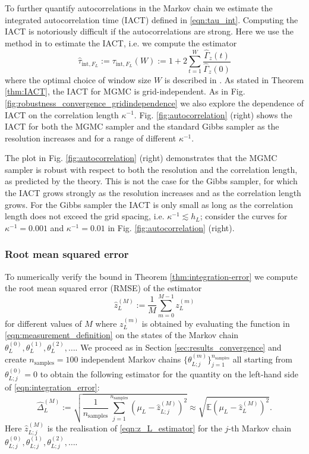\documentclass[11pt,english]{article}
\theoremstyle{plain}
\theoremstyle{plain}
\theoremstyle{plain}
\theoremstyle{plain}
\numberwithin{equation}{section}
\begin{document}
To further quantify autocorrelations in the Markov chain we estimate the integrated autocorrelation time (IACT) defined in \eqref{eqn:tau_int}. Computing the IACT is notoriously difficult if the autocorrelations are strong. Here we use the method in \cite{wolff2004monte} to estimate the IACT, i.e. we compute the estimator
\begin{equation}
    \widehat{\tau}_{\text{int},F_L} := \tau_{\text{int},F_L}(W) := 1+2\sum_{t=1}^{W} \frac{\widehat{\Gamma}_z(t)}{\widehat{\Gamma}_z(0)}
\end{equation}
where the optimal choice of window size $W$ is described in \cite[Section 3.3]{wolff2004monte}.
As stated in Theorem \ref{thm:IACT}, the IACT for MGMC is grid-independent. As in Fig. \ref{fig:robustness_convergence_gridindependence} we also explore the dependence of IACT on the correlation length $\kappa^{-1}$. Fig. \ref{fig:autocorrelation} (right) shows the IACT for both the MGMC sampler and the standard Gibbs sampler as the resolution increases and for a range of different $\kappa^{-1}$.

The plot in Fig. \ref{fig:autocorrelation} (right) demonstrates that the MGMC sampler is robust with respect to both the resolution and the correlation length, as predicted by the theory. This is not the case for the Gibbs sampler, for which the IACT grows strongly as the resolution increases and as the correlation length grows. For the Gibbs sampler the IACT is only small as long as the correlation length does not exceed the grid spacing, i.e. $\kappa^{-1}\lesssim h_L$; consider the curves for $\kappa^{-1}=0.001$ and $\kappa^{-1}=0.01$ in Fig. \ref{fig:autocorrelation} (right).
\subsubsection{Root mean squared error}
To numerically verify the bound in Theorem \ref{thm:integration-error} we compute the root mean squared error (RMSE) of the estimator
\begin{equation}
    \widehat{z}_{L}^{(M)} := \frac{1}{M}\sum_{m=0}^{M-1} z_{L}^{(m)}         \label{eqn:z_L_estimator}
\end{equation}
for different values of $M$ where $z_L^{(m)}$ is obtained by evaluating the function in \eqref{eqn:measurement_definition} on the states of the Markov chain $\theta_L^{(0)}, \theta_L^{(1)},\theta_L^{(2)},\dots$. We proceed as in Section \ref{sec:results_convergence} and create $n_{\mathrm{samples}}=100$ independent Markov chains $\{\theta_{L;j}^{(m)}\}_{j=1}^{n_{\text{samples}}}$ all starting from $\theta_{L;j}^{(0)}=0$ to obtain the following estimator for the quantity on the left-hand side of \eqref{eqn:integration_error}:
\begin{equation}
    \widehat{\Delta}_L^{(M)}          :=\sqrt{\frac{1}{n_{\mathrm{samples}}} \sum_{j=1}^{n_{\mathrm{samples}}} \left(\mu_L - \widehat{z}_{L;j}^{(M)}\right)^2}
    \approx \sqrt{\mathbb{E}\left(\mu_L- \widehat{z}_L^{(M)}\right)^2}
    .\label{eqn:RMSE_estimator}
\end{equation}
Here $\widehat{z}_{L;j}^{(M)}$ is the realisation of \eqref{eqn:z_L_estimator} for the $j$-th Markov chain $\theta_{L;j}^{(0)},\theta_{L;j}^{(1)},\theta_{L;j}^{(2)},\dots$.
\end{document}

